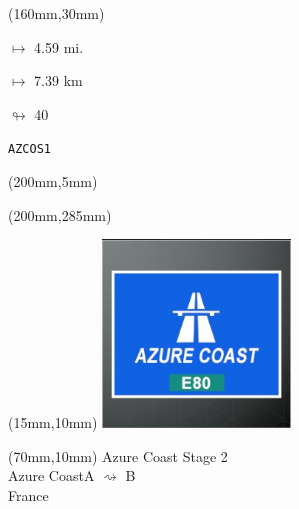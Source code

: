 \begin{textblock*}{40mm}(160mm,30mm)%
\Large
\par$\mapsto$ 4.59 mi.
\par$\mapsto$ 7.39 km
\par$\looparrowright$ 40
\par\hfill\tiny\tt AZCOS1\\
\end{textblock*}
\begin{textblock*}{20mm}(200mm,5mm)%
\fbox{\thepage}
\label{AZCOS1}
\end{textblock*}
\begin{textblock*}{20mm}(200mm,285mm)%
\fbox{\thepage}
\end{textblock*}

\null\newpage
\begin{textblock*}{50mm}(15mm,10mm)%
\includegraphics[width=50mm]{LG/2015-05-20_00073.png}
\end{textblock*}
\begin{textblock*}{130mm}(70mm,10mm)%
{\fontsize{20}{20}\selectfont Azure Coast Stage 2\\}
{\fontsize{16}{16}\selectfont Azure Coast\hfill A $\rightsquigarrow$ B\\}
{\fontsize{12}{12}\selectfont France\\}
\end{textblock*}
